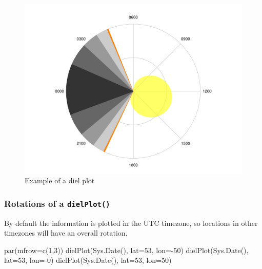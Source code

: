 \documentclass[
]{book}
\newenvironment{Shaded}{\begin{snugshade}}{\end{snugshade}}
\newcommand{\AttributeTok}[1]{\textcolor[rgb]{0.77,0.63,0.00}{#1}}
\newcommand{\DecValTok}[1]{\textcolor[rgb]{0.00,0.00,0.81}{#1}}
\newcommand{\FunctionTok}[1]{\textcolor[rgb]{0.00,0.00,0.00}{#1}}
\newcommand{\NormalTok}[1]{#1}
\newcommand{\SpecialCharTok}[1]{\textcolor[rgb]{0.00,0.00,0.00}{#1}}
\begin{document}
\begin{figure}

{\centering \includegraphics[width=0.9\linewidth]{_main_files/figure-latex/diel-plot-1-1} 

}

\caption{Example of a diel plot}\label{fig:diel-plot-1}
\end{figure}

\hypertarget{rotations-of-a-dielplot}{%
\subsubsection{\texorpdfstring{Rotations of a \texttt{dielPlot()}}{Rotations of a dielPlot()}}\label{rotations-of-a-dielplot}}

By default the information is plotted in the UTC timezone, so locations in other timezones will have an overall rotation.

\begin{Shaded}
\begin{Highlighting}[]
\FunctionTok{par}\NormalTok{(}\AttributeTok{mfrow=}\FunctionTok{c}\NormalTok{(}\DecValTok{1}\NormalTok{,}\DecValTok{3}\NormalTok{))}
\FunctionTok{dielPlot}\NormalTok{(}\FunctionTok{Sys.Date}\NormalTok{(), }\AttributeTok{lat=}\DecValTok{53}\NormalTok{, }\AttributeTok{lon=}\SpecialCharTok{{-}}\DecValTok{50}\NormalTok{)}
\FunctionTok{dielPlot}\NormalTok{(}\FunctionTok{Sys.Date}\NormalTok{(), }\AttributeTok{lat=}\DecValTok{53}\NormalTok{, }\AttributeTok{lon=}\SpecialCharTok{{-}}\DecValTok{0}\NormalTok{)}
\FunctionTok{dielPlot}\NormalTok{(}\FunctionTok{Sys.Date}\NormalTok{(), }\AttributeTok{lat=}\DecValTok{53}\NormalTok{, }\AttributeTok{lon=}\DecValTok{50}\NormalTok{)}
\end{Highlighting}
\end{Shaded}
\end{document}
